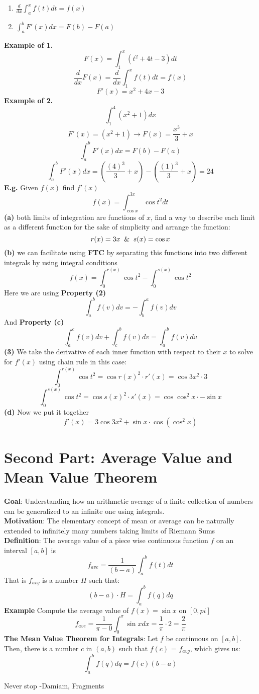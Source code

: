 \documentclass[12pt, letterpaper]{article}
\newcommand{\iii}{\ensuremath{\int_{a}^{b} f(q)dq}}
\newcommand{\ii}{\ensuremath{\int_{a}^{b}}}
\begin{document}
\begin{enumerate}
    \item \(\frac{d}{dx}\int_{a}^{x}f(t)dt = f(x)\)
    \item \(\int_{a}^{b}F'(x)dx = F(b)-F(a)\)
\end{enumerate}
\textbf{Example of 1.} 
\[F(x) = \int_{1}^{x}(t^2+4t-3)dt\]
\[\frac{d}{dx}F(x) = \frac{d}{dx}\int_{1}^{x} f(t)dt = f(x)\]
\[F'(x) = x^2+4x-3\]
\textbf{Example of 2.}
\[\int_{1}^{4}(x^2+1)dx\]
\[F'(x) = (x^2+1) \to F(x) = \frac{x^3}{3}+x\]
\[\int_{a}^{b}F'(x)dx = F(b)-F(a)\]
\[\int_{a}^{b}F'(x)dx = \left( \frac{(4)^3}{3}+x \right) - \left( \frac{(1)^3}{3}+x \right) = 24\]
\textbf{E.g.} Given \(f(x)\) find \(f'(x)\)
\[f(x) = \int_{\cos{x}}^{3x}\cos{t^2}dt\]
\textbf{(a)} both limits of integration are functions of \(x\), find a way to describe each limit as a different function for the sake of simplicity and arrange the function:
\[r(x) = 3x \And s(x) = \cos{x}\]
\textbf{(b)} we can facilitate using \textbf{FTC} by separating this functions into two different integrals by using integral conditions
\[f(x) = \int_{0}^{r(x)} \cos{t^2} - \int_{0}^{s(x)} \cos{t^2}\]
Here we are using \textbf{Property (2)}
\[\int_{a}^{b}f(v)dv=-\int_{b}^{a}f(v)dv\]
And \textbf{Property (c)}
\[\int_{a}^{c}f(v)dv+\int_{c}^{b}f(v)dv = \int_{a}^{b}f(v)dv\]
\textbf{(3)} We take the derivative of each inner function with respect to their \(x\) to solve for \(f'(x)\) using chain rule in this case:
\[\int_{0}^{r(x)} \cos{t^2} = \cos{r(x)^2} \cdot r'(x) = \cos{3x^2} \cdot 3\]
\[\int_{0}^{s(x)} \cos{t^2} = \cos{s(x)^2} \cdot s'(x) = \cos{\cos^2{x}} \cdot -\sin{x}\]
\textbf{(d)} Now we put it together
\[f'(x) = 3\cos{3x^2} + \sin{x} \cdot \cos{(\cos^2{x})}\]

\section{Second Part: Average Value and Mean Value Theorem}
\textbf{Goal}: Understanding how an arithmetic average of a finite collection of numbers can be generalized to an infinite one using integrals.\\
\newline
\textbf{Motivation}: The elementary concept of mean or average can be naturally extended to infinitely many numbers taking limits of Riemann Sums\\
\newline
\textbf{Definition}: The average value of a piece wise continuous function \(f\) on an interval \([a,b]\) is
\[f_{ave}=\frac{1}{(b-a)}\ii f(t)dt\]
That is \(f_{avg}\) is a number \(H\) such that:
\[(b-a)\cdot H = \iii\]
\textbf{Example} Compute the average value of \(f(x)=\sin{x}\) on \([0,pi]\)
\[f_{ave}=\frac{1}{\pi-0}\int_{0}^{\pi}\sin{x}dx=\frac{1}{\pi}\cdot 2 = \frac{2}{\pi}\]
\textbf{The Mean Value Theorem for Integrals}: Let \(f\) be continuous on \([a,b]\). Then, there is a number \(c\) in \((a,b)\) such that \(f(c)\) = \(f_{avg}\), which gives us:
\[\iii = f(c)(b-a)\]

Never stop
-Damiam, Fragments
\end{document}
